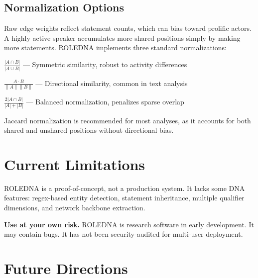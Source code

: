 \documentclass[../main.tex]{subfiles}
\begin{document}
\subsection{Normalization Options}

Raw edge weights reflect statement counts, which can bias toward prolific actors. A highly active speaker accumulates more shared positions simply by making more statements. ROLEDNA implements three standard normalizations:

\begin{description}[leftmargin=0.5cm, itemsep=0.3em]
\item[Jaccard] $\frac{|A \cap B|}{|A \cup B|}$ --- Symmetric similarity, robust to activity differences

\item[Cosine] $\frac{A \cdot B}{\|A\| \|B\|}$ --- Directional similarity, common in text analysis

\item[Average Activity] $\frac{2|A \cap B|}{|A| + |B|}$ --- Balanced normalization, penalizes sparse overlap
\end{description}

\noindent Jaccard normalization is recommended for most analyses, as it accounts for both shared and unshared positions without directional bias.


\section{Current Limitations}

ROLEDNA is a proof-of-concept, not a production system. It lacks some DNA features: regex-based entity detection, statement inheritance, multiple qualifier dimensions, and network backbone extraction.

\begin{importantbox}
\textbf{Use at your own risk.} ROLEDNA is research software in early development. It may contain bugs. It has not been security-audited for multi-user deployment.
\end{importantbox}


\section{Future Directions}
\end{document}
